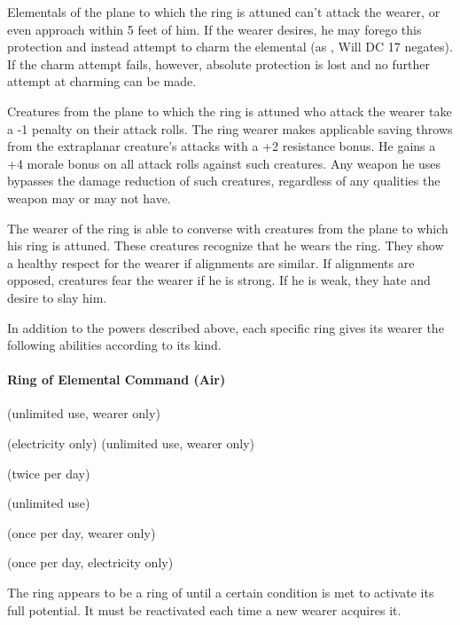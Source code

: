 Elementals of the plane to which the ring is attuned can't attack the wearer, or even approach within 5 feet of him. If the wearer desires, he may forego this protection and instead attempt to charm the elemental (as , Will DC 17 negates). If the charm attempt fails, however, absolute protection is lost and no further attempt at charming can be made.

Creatures from the plane to which the ring is attuned who attack the wearer take a -1 penalty on their attack rolls. 
The ring wearer makes applicable saving throws from the extraplanar creature's attacks with a +2 resistance bonus. 
He gains a +4 morale bonus on all attack rolls against such creatures. 
Any weapon he uses bypasses the damage reduction of such creatures, regardless of any qualities the weapon may or may not have.

The wearer of the ring is able to converse with creatures from the plane to which his ring is attuned. 
These creatures recognize that he wears the ring. 
They show a healthy respect for the wearer if alignments are similar. 
If alignments are opposed, creatures fear the wearer if he is strong. If he is weak, they hate and desire to slay him.

In addition to the powers described above, each specific ring gives its wearer the following abilities according to its kind.

\paragraph{Ring of Elemental Command (Air)}
\begin{list}{}{\leftmargin=1em}
\item {} (unlimited use, wearer only)
\item {} (electricity only) (unlimited use, wearer only)
\item {} (twice per day)
\item {} (unlimited use)
\item {} (once per day, wearer only)
\item {} (once per day, electricity only)
\end{list}
The ring appears to be a ring of  until a certain condition is met to activate its full potential. It must be reactivated each time a new wearer acquires it.

